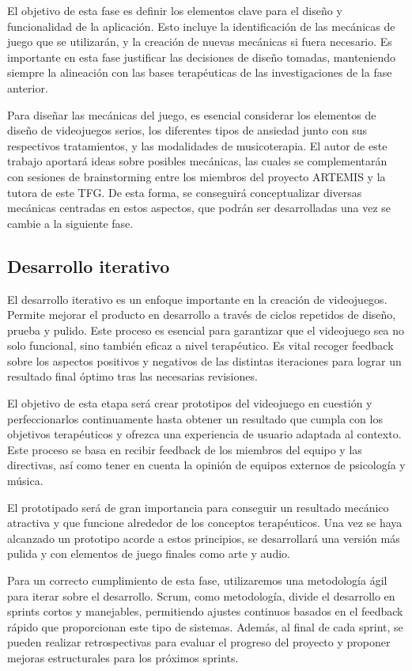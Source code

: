 El objetivo de esta fase es definir los elementos clave para el diseño y funcionalidad de la aplicación. Esto incluye la identificación de las mecánicas de juego que se utilizarán, y la creación de nuevas mecánicas si fuera necesario. Es importante en esta fase justificar las decisiones de diseño tomadas, manteniendo siempre la alineación con las bases terapéuticas de las investigaciones de la fase anterior. 

Para diseñar las mecánicas del juego, es esencial considerar los elementos de diseño de videojuegos serios, los diferentes tipos de ansiedad junto con sus respectivos tratamientos, y las modalidades de musicoterapia. El autor de este trabajo aportará ideas sobre posibles mecánicas, las cuales se complementarán con sesiones de brainstorming entre los miembros del proyecto ARTEMIS y la tutora de este TFG. De esta forma, se conseguirá conceptualizar diversas mecánicas centradas en estos aspectos, que podrán ser desarrolladas una vez se cambie a la siguiente fase.

\subsection{Desarrollo iterativo}

El desarrollo iterativo es un enfoque importante en la creación de videojuegos. Permite mejorar el producto en desarrollo a través de ciclos repetidos de diseño, prueba y pulido. Este proceso es esencial para garantizar que el videojuego sea no solo funcional, sino también eficaz a nivel terapéutico. Es vital recoger feedback sobre los aspectos positivos y negativos de las distintas iteraciones para lograr un resultado final óptimo tras las necesarias revisiones.

El objetivo de esta etapa será crear prototipos del videojuego en cuestión y perfeccionarlos continuamente hasta obtener un resultado que cumpla con los objetivos terapéuticos y ofrezca una experiencia de usuario adaptada al contexto. Este proceso se basa en recibir feedback de los miembros del equipo y las directivas, así como tener en cuenta la opinión de equipos externos de psicología y música.

El prototipado será de gran importancia para conseguir un resultado mecánico atractiva y que funcione alrededor de los conceptos terapéuticos. Una vez se haya alcanzado un prototipo acorde a estos principios, se desarrollará una versión más pulida y con elementos de juego finales como arte y audio.

Para un correcto cumplimiento de esta fase, utilizaremos una metodología ágil para iterar sobre el desarrollo. Scrum, como metodología, divide el desarrollo en sprints cortos y manejables, permitiendo ajustes continuos basados en el feedback rápido que proporcionan este tipo de sistemas. Además, al final de cada sprint, se pueden realizar retrospectivas para evaluar el progreso del proyecto y proponer mejoras estructurales para los próximos sprints.

